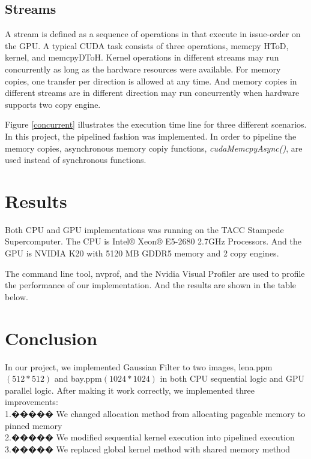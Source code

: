 \documentclass[journal,11pt,onecolumn,draftclsnofoot]{ieeeconf}  %
\begin{document}
\subsection{Streams}
A stream is defined as a sequence of operations in that execute in issue-order on the GPU. A typical CUDA task consists of three operations, memcpy HToD, kernel, and memcpyDToH. Kernel operations in different streams may run concurrently as long as the hardware resources were available. For memory copies, one transfer per direction is allowed at any time. And memory copies in different streams are in different direction may run concurrently when hardware supports two copy engine.   \par

Figure \ref{concurrent} illustrates the execution time line for three different scenarios. In this project, the pipelined fashion was implemented. In order to pipeline the memory copies, asynchronous memory copiy functions, \textit{cudaMemcpyAsync()}, are used instead of synchronous functions.\cite{Stream} \par

\section{Results}
Both CPU and GPU implementations was running on the TACC Stampede Supercomputer. The CPU is Intel® Xeon® E5-2680 2.7GHz Processors. And the GPU is NVIDIA K20 with 5120 MB GDDR5 memory and 2 copy engines. \par
The command line tool, nvprof, and the Nvidia Visual Profiler are used to profile the performance of our implementation. And the results are shown in the table below.

\section{Conclusion} 
In our project, we implemented Gaussian Filter to two images, lena.ppm$(512*512)$ and bay.ppm$(1024*1024)$ in both CPU sequential logic and GPU parallel logic. After making it work correctly, we implemented three improvements:  \\
1.����� We changed allocation method from allocating pageable memory to pinned memory \\
2.����� We modified sequential kernel execution into pipelined execution \\
3.����� We replaced global kernel method with shared memory method \\
\end{document}

